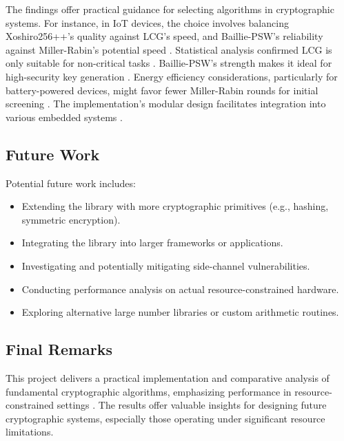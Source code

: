 The findings offer practical guidance for selecting algorithms in cryptographic systems. For instance, in IoT devices, the choice involves balancing Xoshiro256++'s quality against LCG's speed, and Baillie-PSW's reliability against Miller-Rabin's potential speed \cite{energy_prng, prime_iot}. Statistical analysis confirmed LCG is only suitable for non-critical tasks \cite{lcg_applications, nist_test_suite}. Baillie-PSW's strength makes it ideal for high-security key generation \cite{baillie_attacks, pomerance2001}. Energy efficiency considerations, particularly for battery-powered devices, might favor fewer Miller-Rabin rounds for initial screening \cite{iot_survey}. The implementation's modular design facilitates integration into various embedded systems \cite{embedded_benchmarking, embedded_crypto}.

\subsection{Future Work}

Potential future work includes:

\begin{itemize}
    \item Extending the library with more cryptographic primitives (e.g., hashing, symmetric encryption).
    \item Integrating the library into larger frameworks or applications.
    \item Investigating and potentially mitigating side-channel vulnerabilities.
    \item Conducting performance analysis on actual resource-constrained hardware.
    \item Exploring alternative large number libraries or custom arithmetic routines.
\end{itemize}

\subsection{Final Remarks}

This project delivers a practical implementation and comparative analysis of fundamental cryptographic algorithms, emphasizing performance in resource-constrained settings \cite{resource_constrained, embedded_crypto}. The results offer valuable insights for designing future cryptographic systems, especially those operating under significant resource limitations. 